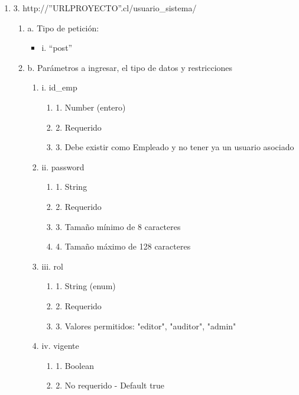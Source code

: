 \begin{enumerate}
    \item 3. http://”URLPROYECTO”.cl/usuario\_sistema/
    \begin{enumerate}
        \item a. Tipo de petición:
            \begin{itemize}
               \item i. “post”
            \end{itemize}
        \item b. Parámetros a ingresar, el tipo de datos y restricciones
            \begin{enumerate}
                \item i. id\_emp
                    \begin{enumerate}
                        \item 1. Number (entero)
                        \item 2. Requerido
                        \item 3. Debe existir como Empleado y no tener ya un usuario asociado
                    \end{enumerate}
                \item ii. password
                    \begin{enumerate}
                        \item 1. String
                        \item 2. Requerido
                        \item 3. Tamaño mínimo de 8 caracteres
                        \item 4. Tamaño máximo de 128 caracteres
                    \end{enumerate}
                \item iii. rol
                    \begin{enumerate}
                        \item 1. String (enum)
                        \item 2. Requerido
                        \item 3. Valores permitidos: "editor", "auditor", "admin"
                    \end{enumerate}
                \item iv. vigente
                    \begin{enumerate}
                        \item 1. Boolean
                        \item 2. No requerido - Default true
                    \end{enumerate}
            \end{enumerate}
    \end{enumerate}


\end{enumerate}
